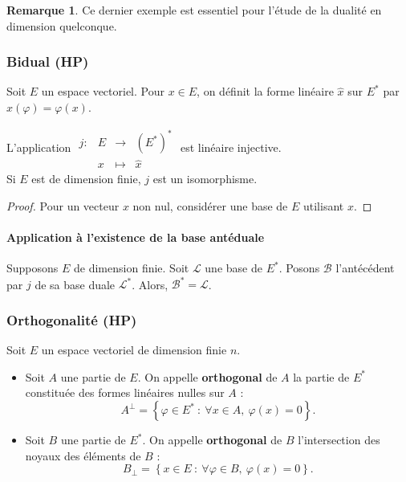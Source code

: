 \documentclass[french]{article}
\newcommand{\st}{^*}
\theoremstyle{plain}
\theoremstyle{definition}
\newtheorem*{rmq}{Remarque}
\theoremstyle{remark}
\begin{document}
\begin{rmq}
	Ce dernier exemple est essentiel pour l'étude de la dualité en dimension quelconque.
\end{rmq}

\subsubsection*{Bidual (HP)}

Soit $E$ un espace vectoriel. Pour $x\in E$, on définit la forme linéaire $\hat{x}$ sur $E\st$ par $\hat{x}(\varphi)=\varphi(x)$.

\begin{prop}%
	L'application $\displaystyle\begin{array}{lrcl}
		j:&E&\longrightarrow&(E\st)\st\\
		&x&\longmapsto&\hat{x}
	\end{array}$ est linéaire injective. \\ Si $E$ est de dimension finie, $j$ est un isomorphisme.
\end{prop}
\begin{proof}
	Pour un vecteur $x$ non nul, considérer une base de $E$ utilisant $x$.
\end{proof}

\paragraph{Application à l'existence de la base antéduale} Supposons $E$ de dimension finie. Soit $\mathcal{L}$ une base de $E\st$. Posons $\mathcal{B}$ l'antécédent par $j$ de sa base duale $\mathcal{L}\st$. Alors, $\mathcal{B}\st=\mathcal{L}$.

\subsubsection*{Orthogonalité (HP)}

Soit $E$ un espace vectoriel de dimension finie $n$.

\begin{dfn}
	\begin{itemize}
		\item Soit $A$ une partie de $E$. On appelle \textbf{orthogonal} de $A$ la partie de $E\st$ constituée des formes linéaires nulles sur $A$ : $$A^{\bot}=\left\{\varphi\in E\st\ : \ \forall x\in A,\ \varphi(x)=0\right\}.$$
		\item Soit $B$ une partie de $E\st$. On appelle \textbf{orthogonal} de $B$ l'intersection des noyaux des éléments de $B$ : $$B_\bot=\left\{x\in E\ : \ \forall\varphi\in B,\ \varphi(x)=0\right\}.$$
	\end{itemize}
\end{dfn}
\end{document}
